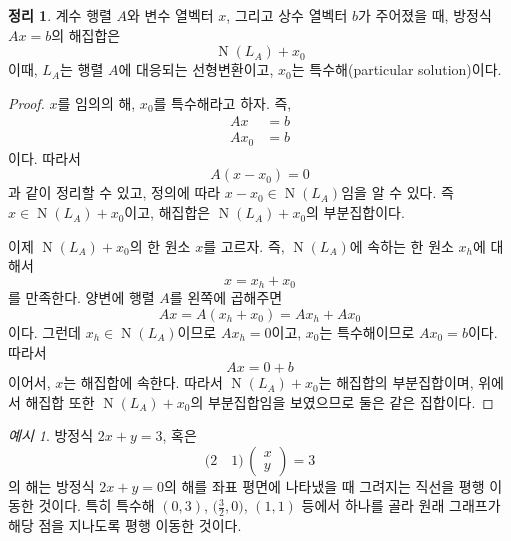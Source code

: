 \documentclass[unfonts,oneside,a4paper]{oblivoir}
\theoremstyle{definition}
\theoremstyle{theorem}
\newtheorem{theorem}{정리}[section]
\theoremstyle{theorem}
\theoremstyle{remark}
\theoremstyle{remark}
\theoremstyle{remark}
\newtheorem*{example}{예시}
\theoremstyle{remark}
\renewcommand{\vec}[1]{\bm{\mathit{#1}}}
\newcommand{\vecz}{\bm{\mathrm{0}}}
\DeclareMathOperator{\Null}{N}
\begin{document}
\begin{theorem} \label{thm:nonhomogeneous}
    계수 행렬 $A$와 변수 열벡터 $\vec x$, 그리고 상수 열벡터 $\vec b$가 주어졌을 때, 방정식 $A \vec x = \vec b$의 해집합은
    \begin{equation*}
        \Null(L_A) + \vec x_0
    \end{equation*}
    이때, $L_A$는 행렬 $A$에 대응되는 선형변환이고, $\vec x_0$는 특수해(particular solution)이다.
\end{theorem}
\begin{proof}
    $\vec x$를 임의의 해, $\vec x_0$를 특수해라고 하자.
    즉,
    \begin{align*}
        A\vec x &= \vec b\\
        A\vec x_0 &= \vec b
    \end{align*}
    이다.
    따라서
    \begin{equation*}
        A(\vec x - \vec x_0) = 0
    \end{equation*}
    과 같이 정리할 수 있고, 정의에 따라 $\vec x - \vec x_0 \in \Null(L_A)$임을 알 수 있다.
    즉 $\vec x \in \Null(L_A) + \vec x_0$이고, 해집합은 $\Null(L_A) + \vec x_0$의 부분집합이다.

    이제 $\Null(L_A) + \vec x_0$의 한 원소 $\vec x$를 고르자.
    즉, $\Null(L_A)$에 속하는 한 원소 $\vec x_h$에 대해서
    \begin{equation*}
        \vec x = \vec x_h + \vec x_0
    \end{equation*}
    를 만족한다.
    양변에 행렬 $A$를 왼쪽에 곱해주면
    \begin{equation*}
        A \vec x = A (\vec x_h + \vec x_0) = A \vec x_h + A \vec x_0
    \end{equation*}
    이다.
    그런데 $\vec x_h \in \Null(L_A)$이므로 $A \vec x_h = \vecz$이고, $\vec x_0$는 특수해이므로 $A \vec x_0 = \vec b$이다.
    따라서
    \begin{equation*}
        A \vec x = \vecz + \vec b
    \end{equation*}
    이어서, $\vec x$는 해집합에 속한다.
    따라서 $\Null(L_A) + \vec x_0$는 해집합의 부분집합이며, 위에서 해집합 또한 $\Null(L_A) + \vec x_0$의 부분집합임을 보였으므로 둘은 같은 집합이다.
\end{proof}

\begin{example}
    방정식 $2x + y = 3$, 혹은
    \begin{equation*}
        \bigl(2 \quad 1\bigr)\,
        \begin{pmatrix}
            x\\
            y
        \end{pmatrix}
        = 3
    \end{equation*}
    의 해는 방정식 $2x + y = 0$의 해를 좌표 평면에 나타냈을 때 그려지는 직선을 평행 이동한 것이다.
    특히 특수해 $(0, 3)$, $\bigl(\frac 32, 0\bigr)$, $(1, 1)$ 등에서 하나를 골라 원래 그래프가 해당 점을 지나도록 평행 이동한 것이다.
\end{example}
\end{document}
